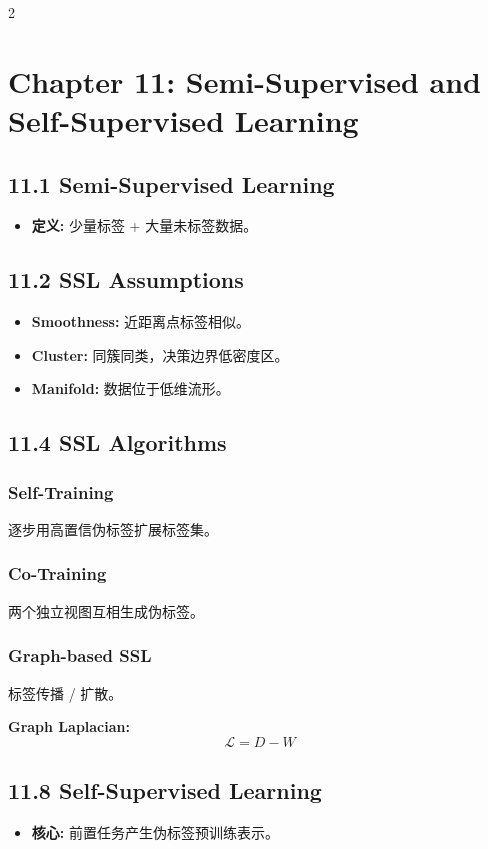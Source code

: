 \documentclass[6pt,a4paper]{ctexart}
\begin{document}
\begin{multicols}{2}
\section*{Chapter 11: Semi-Supervised and Self-Supervised Learning}

\subsection*{11.1 Semi-Supervised Learning}
\begin{itemize}
    \item \textbf{定义:} 少量标签 + 大量未标签数据。
\end{itemize}

\subsection*{11.2 SSL Assumptions}
\begin{itemize}
    \item \textbf{Smoothness:} 近距离点标签相似。
    \item \textbf{Cluster:} 同簇同类，决策边界低密度区。
    \item \textbf{Manifold:} 数据位于低维流形。
\end{itemize}

\subsection*{11.4 SSL Algorithms}

\subsubsection*{Self-Training}
逐步用高置信伪标签扩展标签集。

\subsubsection*{Co-Training}
两个独立视图互相生成伪标签。

\subsubsection*{Graph-based SSL}
标签传播 / 扩散。

\textbf{Graph Laplacian:}
$$ \mathcal{L} = D - W $$

\subsection*{11.8 Self-Supervised Learning}
\begin{itemize}
    \item \textbf{核心:} 前置任务产生伪标签预训练表示。
\end{itemize}


\end{multicols}
\end{document}
